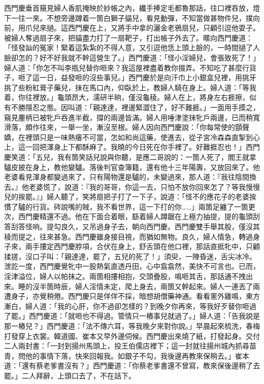 西門慶垂首窺見婦人香肌掩映於紗帳之內，纖手捧定毛都魯那話，往口裡吞放，燈下一往一來。不想旁邊蹲着一箇白獅子貓兒，看見動彈，不知當做甚物件兒，撲向前，用爪兒來撾。{}這西門慶在上，又將手中拿的灑金老鴉扇兒，只顧引逗他耍子。被婦人奪過扇子來，把貓盡力打了一扇靶子，打出帳子外去了。暱向西門慶道：「怪發訕的冤家！緊着這紮紮的不得人意，又引逗他恁上頭上臉的，一時間撾了人臉卻怎的？好不好我就不幹這營生了。」西門慶道：「怪小淫婦兒，會張致死了！」婦人道：「你怎不叫李瓶兒替你咂來？我這屋裡盡着教你掇弄。不知吃了甚麼行貨子，咂了這一日，益發咂的沒些事兒。」西門慶於是向汗巾上小銀盒兒裡，用挑牙挑了些粉紅膏子藥兒，抹在馬口內，仰臥於上，教婦人騎在身上。婦人道：「等我𢵞着，你往裡放。」龜頭昂大，濡研半晌，僅沒龜稜。婦人在上，將身左右捱擦，似有不勝隱忍之態。因叫道：「親達達，裡邊緊澀住了，好不難捱。」一面用手摸之，窺見麈柄已被牝戶吞進半截，撐的兩邊皆滿。婦人用唾津塗抹牝戶兩邊，已而稍寬滑落，頗作往來，一舉一坐，漸沒至根。婦人因向西門慶說：「你每常使的顫聲嬌，在裡頭只是一味熱癢不可當，怎如和尚這藥，使進去，從子宮冷森森直掣到心上，這一回把渾身上下都酥麻了。我曉的今日死在你手裡了。好難捱忍也！」{}西門慶笑道：「五兒，我有箇笑話兒說與你聽，是應二哥說的：一箇人死了，閻王就拿驢皮披在身上，教他變驢。落後判官查簿籍，還有他十三年陽壽，又放回來了。他老婆看見渾身都變過來了，只有陽物還是驢的，未變過來，那人道：『我往陰間換去。』他老婆慌了，說道：『我的哥哥，你這一去，只怕不放你回來怎了？等我慢慢兒的挨罷。』」婦人聽了，笑將扇把子打了一下子，說道：「怪不的應花子的老婆挨慣了驢的行貨。硶說嘴的賊，我不看世界，這一下打的你……」兩箇足纏了一箇更次，西門慶精還不過。他在下面合着眼，繇着婦人蹲踞在上極力抽提，提的龜頭刮答刮答怪响。提勾良久，又吊過身子去，朝向西門慶。西門慶雙手舉其股，僅沒其稜而提之，往來甚急。西門慶雖身接目視，而猶如無物。良久，婦人情急，轉過身子來，兩手摟定西門慶脖項，合伏在身上，舒舌頭在他口裡，那話直抵牝中，只顧揉搓，沒口子叫：「親達達，罷了，五兒的死了！」須臾，一陣昏迷，舌尖冰冷。泄訖一度，西門慶覺牝中一股熱氣直透丹田，心中翕翕然，美快不可言也。已而，淫津溢位，婦人以帕抹之。兩箇相摟相抱，交頭疊股，鳴咂其舌，那話通不拽出來。睡的沒半箇時辰，婦人淫情未定，爬上身去，兩箇又幹起來。婦人一連丟了兩遭身子，亦覺稍倦。西門慶只是佯佯不採，暗想胡僧藥神通。看看窻外雞鳴，東方漸白，婦人道：「我的心肝，你不過卻怎樣的？到晚夕你再來，等我好歹替你咂過了罷。」西門慶道：「就咂也不得過。管情只一樁事兒就過了。」婦人道：「告我說是那一樁兒？」西門慶道：「法不傳六耳，等我晚夕來對你說。」早晨起來梳洗，春梅打發穿上衣裳。韓道國、崔本又早外邊伺候。西門慶出來燒了紙，打發起身。交付二人兩封書：「一封到揚州馬頭上，投王伯儒店裡下；這一封就往揚州城內抓尋苗青，問他的事情下落，快來回報我。如銀子不勾，我後邊再教來保稍去。」崔本道：「還有蔡老爹書沒有？」西門慶道：「你蔡老爹書還不曾寫，教來保後邊稍了去罷。」二人拜辭，上頭口去了，不在話下。

